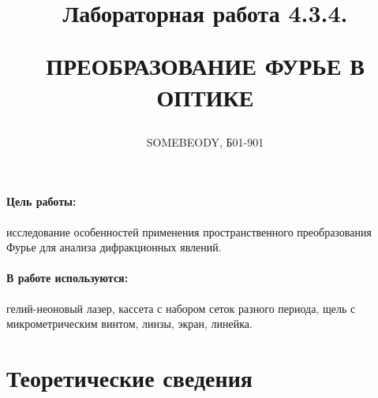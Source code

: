 \documentclass[a5paper,10pt, twoside]{article} %
\title
{
\hfill \break	\hfill \break
\hfill \break	\hfill \break
Лабораторная работа 4.3.4.

ПРЕОБРАЗОВАНИЕ ФУРЬЕ В ОПТИКЕ
}
\author{SOMEBEODY, Б01-901}
\begin{document}
\maketitle


\thispagestyle{empty} %

\newpage

\tableofcontents %

\newpage


\paragraph{Цель работы:}

исследование особенностей применения пространственного преобразования Фурье
для анализа дифракционных явлений.


\paragraph{В работе используются:}

гелий-неоновый лазер, кассета с набором
сеток разного периода, щель с микрометрическим винтом, линзы,
экран, линейка.

\section{Теоретические сведения}
\end{document}

